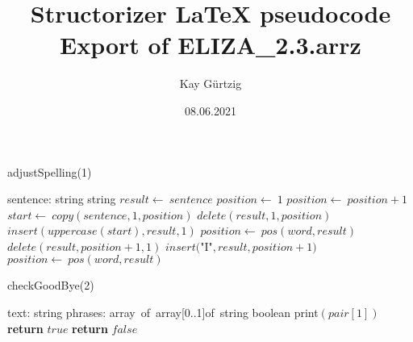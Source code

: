 \documentclass[a4paper,10pt]{article}
\title{Structorizer LaTeX pseudocode Export of ELIZA_2.3.arrz}
\author{Kay Gürtzig}
\date{08.06.2021}
\begin{document}
\begin{algorithm}
\caption{adjustSpelling(1)}
\begin{algorithmic}[5]
\State {}
    \State sentence: string
  \EndDecl
    \State string
  \EndDecl
  \State \(result\gets\ sentence\)
  \State \(position\gets\ 1\)
    \State \(position\gets\ position+1\)
  \EndWhile
    \State \(start\gets\ copy(sentence,1,position)\)
    \State \(delete(result,1,position)\)
    \State \(insert(uppercase(start),result,1)\)
  \EndIf
    \State \(position\gets\ pos(word,result)\)
      \State \(delete(result,position+1,1)\)
      \State \(insert(\)"{}I"{}\(,result,position+1)\)
      \State \(position\gets\ pos(word,result)\)
    \EndWhile
  \EndFor
\EndFunction
\end{algorithmic}
\end{algorithm}


\begin{algorithm}
\caption{checkGoodBye(2)}
\begin{algorithmic}[5]
\State {}
\State {}
\State {}
\State {}
    \State text: string
    \State phrases: array\ of\ array[0..1]of\ string
  \EndDecl
    \State boolean
  \EndDecl
      \State \(\)print\((pair[1])\)
      \State \textbf{return} \(true\)
    \EndIf
  \EndFor
  \State \textbf{return} \(false\)
\EndFunction
\end{algorithmic}
\end{algorithm}
\end{document}
